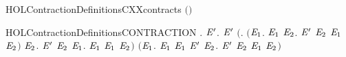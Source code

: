 \newcommand{\HOLContractionDate}{27 October 2021}
\newcommand{\HOLContractionTime}{11:41}
\begin{SaveVerbatim}{HOLContractionDefinitionsCXXcontracts}
\HOLTokenTurnstile{}  \HOLSymConst{\ensuremath{=}}  \ensuremath{(}\ensuremath{)}
\end{SaveVerbatim}
\newcommand{\HOLContractionDefinitionsCXXcontracts}{\UseVerbatim{HOLContractionDefinitionsCXXcontracts}}
\begin{SaveVerbatim}{HOLContractionDefinitionsCONTRACTION}
\HOLTokenTurnstile{} \HOLSymConst{\HOLTokenForall{}}.
       \HOLSymConst{\HOLTokenEquiv{}}
     \HOLSymConst{\HOLTokenForall{}} \ensuremath{\HOLBoundVar{E}\sp{\prime{}}}.
         \ensuremath{\HOLBoundVar{E}\sp{\prime{}}} \HOLSymConst{\HOLTokenImp{}}
       \ensuremath{(}\HOLSymConst{\HOLTokenForall{}}. \ensuremath{(}\HOLSymConst{\HOLTokenForall{}}\ensuremath{\HOLBoundVar{E}\sb{\mathrm{1}}}.
                \HOLTokenTransBegin{} \HOLTokenTransEnd \ensuremath{\HOLBoundVar{E}\sb{\mathrm{1}}} \HOLSymConst{\HOLTokenImp{}} \HOLSymConst{\HOLTokenExists{}}\ensuremath{\HOLBoundVar{E}\sb{\mathrm{2}}}. \ensuremath{\HOLBoundVar{E}\sp{\prime{}}} \HOLTokenTransBegin{} \HOLTokenTransEnd \ensuremath{\HOLBoundVar{E}\sb{\mathrm{2}}} \HOLSymConst{\HOLTokenConj{}}  \ensuremath{\HOLBoundVar{E}\sb{\mathrm{1}}} \ensuremath{\HOLBoundVar{E}\sb{\mathrm{2}}}\ensuremath{)} \HOLSymConst{\HOLTokenConj{}}
            \HOLSymConst{\HOLTokenForall{}}\ensuremath{\HOLBoundVar{E}\sb{\mathrm{2}}}.
              \ensuremath{\HOLBoundVar{E}\sp{\prime{}}} \HOLTokenTransBegin{} \HOLTokenTransEnd \ensuremath{\HOLBoundVar{E}\sb{\mathrm{2}}} \HOLSymConst{\HOLTokenImp{}}
              \HOLSymConst{\HOLTokenExists{}}\ensuremath{\HOLBoundVar{E}\sb{\mathrm{1}}}.  \HOLTokenWeakTransBegin{} \HOLTokenWeakTransEnd \ensuremath{\HOLBoundVar{E}\sb{\mathrm{1}}} \HOLSymConst{\HOLTokenConj{}}  \ensuremath{\HOLBoundVar{E}\sb{\mathrm{1}}} \ensuremath{\HOLBoundVar{E}\sb{\mathrm{2}}}\ensuremath{)} \HOLSymConst{\HOLTokenConj{}}
       \ensuremath{(}\HOLSymConst{\HOLTokenForall{}}\ensuremath{\HOLBoundVar{E}\sb{\mathrm{1}}}.  \HOLTokenTransBegin\HOLConst{\ensuremath{\tau}}\HOLTokenTransEnd \ensuremath{\HOLBoundVar{E}\sb{\mathrm{1}}} \HOLSymConst{\HOLTokenImp{}}  \ensuremath{\HOLBoundVar{E}\sb{\mathrm{1}}} \ensuremath{\HOLBoundVar{E}\sp{\prime{}}} \HOLSymConst{\HOLTokenDisj{}} \HOLSymConst{\HOLTokenExists{}}\ensuremath{\HOLBoundVar{E}\sb{\mathrm{2}}}. \ensuremath{\HOLBoundVar{E}\sp{\prime{}}} \HOLTokenTransBegin\HOLConst{\ensuremath{\tau}}\HOLTokenTransEnd \ensuremath{\HOLBoundVar{E}\sb{\mathrm{2}}} \HOLSymConst{\HOLTokenConj{}}  \ensuremath{\HOLBoundVar{E}\sb{\mathrm{1}}} \ensuremath{\HOLBoundVar{E}\sb{\mathrm{2}}}\ensuremath{)} \HOLSymConst{\HOLTokenConj{}}

\end{SaveVerbatim}
